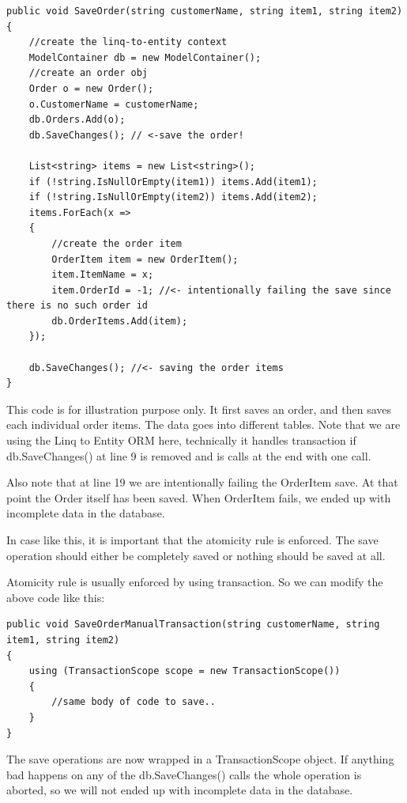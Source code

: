 \begin{lstlisting}[caption={SaveOrder Example}, label=transactionex, frame=tb, basicstyle=\scriptsize]
public void SaveOrder(string customerName, string item1, string item2)
{
	//create the linq-to-entity context
	ModelContainer db = new ModelContainer();
	//create an order obj
	Order o = new Order();
	o.CustomerName = customerName;
	db.Orders.Add(o);
	db.SaveChanges(); // <-save the order!

	List<string> items = new List<string>();
	if (!string.IsNullOrEmpty(item1)) items.Add(item1);
	if (!string.IsNullOrEmpty(item2)) items.Add(item2);
	items.ForEach(x =>
	{
		//create the order item
		OrderItem item = new OrderItem();
		item.ItemName = x;
		item.OrderId = -1; //<- intentionally failing the save since there is no such order id
		db.OrderItems.Add(item);
	});

	db.SaveChanges(); //<- saving the order items
}
\end{lstlisting}

This code is for illustration purpose only. It first saves an order, and then saves each individual order items. The data goes into different tables. Note that we are using the Linq to Entity ORM here, technically it handles transaction if db.SaveChanges() at line 9 is removed and is calls at the end with one call.

Also note that at line 19 we are intentionally failing the OrderItem save. At that point the Order itself has been saved. When OrderItem fails, we ended up with incomplete data in the database.

In case like this, it is important that the atomicity rule is enforced. The save operation should either be completely saved or nothing should be saved at all. 

Atomicity rule is usually enforced by using transaction. So we can modify the above code like this:

\begin{lstlisting}[caption={SaveOrderManualTransaction Example}, label=manualtrans, frame=tb, basicstyle=\scriptsize]
public void SaveOrderManualTransaction(string customerName, string item1, string item2)
{
	using (TransactionScope scope = new TransactionScope())
	{
		//same body of code to save..
	}
}
\end{lstlisting}

The save operations are now wrapped in a TransactionScope object. If anything bad happens on any of the db.SaveChanges() calls the whole operation is aborted, so we will not ended up with incomplete data in the database.

